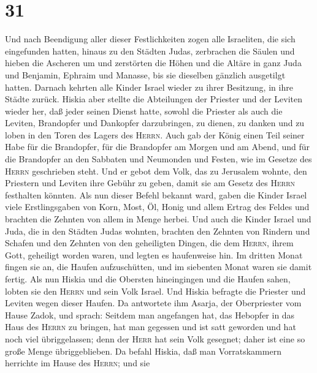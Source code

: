 \hypertarget{section-30}{%
\section{31}\label{section-30}}

 Und nach Beendigung aller dieser Festlichkeiten zogen
alle Israeliten, die sich eingefunden hatten, hinaus zu den Städten
Judas, zerbrachen die Säulen und hieben die Ascheren um und zerstörten
die Höhen und die Altäre in ganz Juda und Benjamin, Ephraim und Manasse,
bis sie dieselben gänzlich ausgetilgt hatten. Darnach kehrten alle
Kinder Israel wieder zu ihrer Besitzung, in ihre Städte zurück.
 Hiskia aber stellte die Abteilungen der Priester und der
Leviten wieder her, daß jeder seinen Dienst hatte, sowohl die Priester
als auch die Leviten, Brandopfer und Dankopfer darzubringen, zu dienen,
zu danken und zu loben in den Toren des Lagers des \textsc{Herrn}.
 Auch gab der König einen Teil seiner Habe für die
Brandopfer, für die Brandopfer am Morgen und am Abend, und für die
Brandopfer an den Sabbaten und Neumonden und Festen, wie im Gesetze des
\textsc{Herrn} geschrieben steht.  Und er gebot dem Volk,
das zu Jerusalem wohnte, den Priestern und Leviten ihre Gebühr zu geben,
damit sie am Gesetz des \textsc{Herrn} festhalten könnten.
 Als nun dieser Befehl bekannt ward, gaben die Kinder
Israel viele Erstlingsgaben von Korn, Most, Öl, Honig und allem Ertrag
des Feldes und brachten die Zehnten von allem in Menge herbei.
 Und auch die Kinder Israel und Juda, die in den Städten
Judas wohnten, brachten den Zehnten von Rindern und Schafen und den
Zehnten von den geheiligten Dingen, die dem \textsc{Herrn}, ihrem Gott,
geheiligt worden waren, und legten es haufenweise hin.  Im
dritten Monat fingen sie an, die Haufen aufzuschütten, und im siebenten
Monat waren sie damit fertig.  Als nun Hiskia und die
Obersten hineingingen und die Haufen sahen, lobten sie den
\textsc{Herrn} und sein Volk Israel.  Und Hiskia befragte
die Priester und Leviten wegen dieser Haufen.  Da
antwortete ihm Asarja, der Oberpriester vom Hause Zadok, und sprach:
Seitdem man angefangen hat, das Hebopfer in das Haus des \textsc{Herrn}
zu bringen, hat man gegessen und ist satt geworden und hat noch viel
übriggelassen; denn der \textsc{Herr} hat sein Volk gesegnet; daher ist
eine so große Menge übriggeblieben.  Da befahl Hiskia,
daß man Vorratskammern herrichte im Hause des \textsc{Herrn}; und sie
